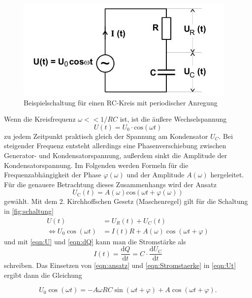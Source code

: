 \begin{figure}
    \centering
    \includegraphics{images/Schaltung.JPG}
    \caption{Beispielschaltung für einen RC-Kreis mit periodischer Anregung \cite{VA}}
    \label{fig:schaltung}
\end{figure}
Wenn die Kreisfrequenz $ \omega << 1/RC$ ist, ist die äußere Wechselspannung  
\begin{equation}
    U(t) = U_0 \cdot \text{cos}(\omega t)
\end{equation}
zu jedem Zeitpunkt praktisch gleich der Spannung am Kondensator $U_C$. Bei steigender Frequenz entsteht allerdings eine Phasenverschiebung zwischen Generator- und Kondensatorspannung, außerdem sinkt die Amplitude der Kondensatorspannung. Im Folgenden werden Formeln für die Frequenzabhängigkeit der Phase $\varphi(\omega)$ und der Amplitude $A(\omega)$ hergeleitet. Für die genauere Betrachtung dieses Zusammenhangs wird der Ansatz
\begin{equation} 
    U_\text{C}(t) = A(\omega) \text{cos}(\omega t + \varphi(\omega))
    \label{eqn:ansatz}
\end{equation}
gewählt.
Mit dem 2. Kirchhoffschen Gesetz (Maschenregel) gilt für die Schaltung in \autoref{fig:schaltung}
\begin{align}
    \label{eqn:Uta}
    U(t) &= U_R(t) + U_C(t) \\
    \iff     U_0 \cos(\omega t) &= I(t)R +A(\omega) \cos(\omega t + \varphi) 
    \label{eqn:Ut}
\end{align}
und mit \autoref{eqn:U} und \autoref{eqn:dQ} kann man die Stromstärke als
\begin{equation}
    \label{eqn:Stromstaerke}
    I(t) = \frac{\text{d}Q}{\text{d}t} = C \cdot \frac{\text{d}U_\text{C}}{\text{d}t}
\end{equation}
schreiben. Das Einsetzen von \autoref{eqn:ansatz} und \autoref{eqn:Stromstaerke} in \autoref{eqn:Ut} ergibt dann die Gleichung

\begin{equation}
    \label{eqn:gl}
        U_0 \cos(\omega t) = -A  \omega RC \sin(\omega t + \varphi)+
        A \cos(\omega t + \varphi)   \text{.}  
\end{equation}

